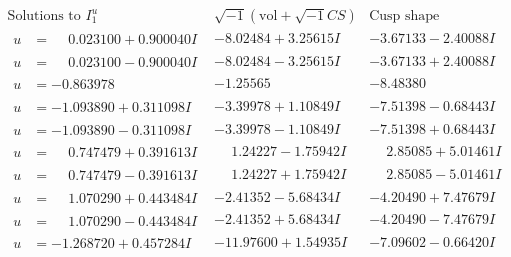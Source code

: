\documentclass[1p]{elsarticle_modified}
\theoremstyle{definition}
\newcommand{\I}{\sqrt{-1}}
\begin{document}
$$\begin{array}{c|c|c}  
\text{Solutions to }I^u_{1}& \I (\text{vol} + \sqrt{-1}CS) & \text{Cusp shape}\\
 \hline 
\begin{aligned}
u &= \phantom{-}0.023100 + 0.900040 I\end{aligned}
 & -8.02484 + 3.25615 I & -3.67133 - 2.40088 I \\ \hline\begin{aligned}
u &= \phantom{-}0.023100 - 0.900040 I\end{aligned}
 & -8.02484 - 3.25615 I & -3.67133 + 2.40088 I \\ \hline\begin{aligned}
u &= -0.863978\phantom{ +0.000000I}\end{aligned}
 & -1.25565\phantom{ +0.000000I} & -8.48380\phantom{ +0.000000I} \\ \hline\begin{aligned}
u &= -1.093890 + 0.311098 I\end{aligned}
 & -3.39978 + 1.10849 I & -7.51398 - 0.68443 I \\ \hline\begin{aligned}
u &= -1.093890 - 0.311098 I\end{aligned}
 & -3.39978 - 1.10849 I & -7.51398 + 0.68443 I \\ \hline\begin{aligned}
u &= \phantom{-}0.747479 + 0.391613 I\end{aligned}
 & \phantom{-}1.24227 - 1.75942 I & \phantom{-}2.85085 + 5.01461 I \\ \hline\begin{aligned}
u &= \phantom{-}0.747479 - 0.391613 I\end{aligned}
 & \phantom{-}1.24227 + 1.75942 I & \phantom{-}2.85085 - 5.01461 I \\ \hline\begin{aligned}
u &= \phantom{-}1.070290 + 0.443484 I\end{aligned}
 & -2.41352 - 5.68434 I & -4.20490 + 7.47679 I \\ \hline\begin{aligned}
u &= \phantom{-}1.070290 - 0.443484 I\end{aligned}
 & -2.41352 + 5.68434 I & -4.20490 - 7.47679 I \\ \hline\begin{aligned}
u &= -1.268720 + 0.457284 I\end{aligned}
 & -11.97600 + 1.54935 I & -7.09602 - 0.66420 I \\ \hline\begin{aligned}

\end{aligned}
\end{array}$$
\end{document}

